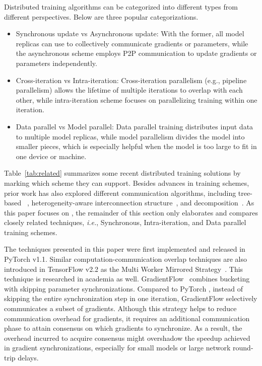 
Distributed training algorithms can be categorized into different types from different perspectives. Below are three popular categorizations.

\begin{itemize}
    \item Synchronous update vs Asynchronous update: With the former, all model replicas can use  to collectively communicate gradients or parameters, while the asynchronous scheme employs P2P communication to update gradients or parameters independently.
    \item Cross-iteration vs Intra-iteration:  Cross-iteration parallelism (e.g., pipeline parallelism) allows the lifetime of multiple iterations to overlap with each other, while intra-iteration scheme focuses on parallelizing training within one iteration. 
    \item Data parallel vs Model parallel: Data parallel training distributes input data to multiple model replicas, while model parallelism divides the model into smaller pieces, which is especially helpful when the model is too large to fit in one device or machine.
\end{itemize}

Table~\ref{tab:related} summarizes some recent distributed training solutions by marking which scheme they can support. Besides advances in training schemes, prior work has also explored different communication algorithms, including tree-based ~\cite{nccl:tree_reduce}, heterogeneity-aware interconnection structure~\cite{wang2019blink}, and  decomposition~\cite{cho2019blueconnect}. As this paper focuses on , the remainder of this section only elaborates and compares closely related techniques, \emph{i.e.}, Synchronous, Intra-iteration, and Data parallel training schemes. 

The techniques presented in this paper were first implemented and released in PyTorch v1.1. Similar computation-communication overlap techniques are also introduced in TensorFlow v2.2 as the Multi Worker Mirrored Strategy~\cite{tf-ddp}. This technique is researched in academia as well. GradientFlow~\cite{sun2019gradientflow} combines bucketing  with skipping parameter synchronizations. Compared to PyTorch , instead of skipping the entire synchronization step in one iteration, GradientFlow selectively communicates a subset of gradients. Although this strategy helps to reduce communication overhead for gradients, it requires an additional communication phase to attain consensus on which gradients to synchronize. As a result, the overhead incurred to acquire consensus might overshadow the speedup achieved in gradient synchronizations, especially for small models or large network round-trip delays.


